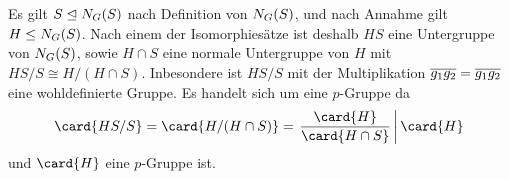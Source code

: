 \section{}





\addtocounter{subsection}{1}





\addtocounter{subsection}{1}





\subsection{}

Es gilt $S \nsubgroup \normalizer{S}{G}$ nach Definition von $\normalizer{S}{G}$, und nach Annahme gilt $H \subgroup \normalizer{S}{G}$.
Nach einem der Isomorphiesätze ist deshalb $HS$ eine Untergruppe von $\normalizer{S}{G}$, sowie $H \cap S$ eine normale Untergruppe von $H$ mit $HS/S \cong H/(H \cap S)$.
Inbesondere ist $HS/S$ mit der Multiplikation $\class{g_1} \class{g_2} = \class{g_1 g_2}$ eine wohldefinierte Gruppe.
Es handelt sich um eine $p$-Gruppe da
\[
                \card{ HS/S }
  =             \card{ H/(H \cap S) }
  = \left.      \frac{ \card{H} }{ \card{H \cap S} }
  \,\middle|\,  \card{H}
    \right.
\]
und $\card{H}$ eine $p$-Gruppe ist.





\addtocounter{subsection}{1}





\addtocounter{subsection}{1}





\addtocounter{subsection}{1}





\addtocounter{subsection}{1}
